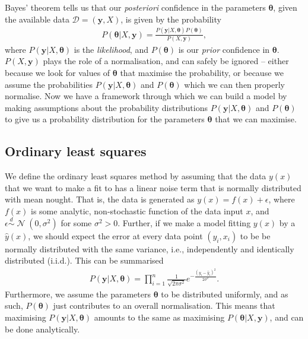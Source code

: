 \documentclass[twocolumn,english,notitlepage]{article}
\renewcommand{\vec}[1]{\boldsymbol{#1}}
\newcommand{\pclosed}[1]{\left(#1\right)}
\renewcommand{\exp}[1]{e^{#1}}
\newcommand{\normal}[2]{\operatorname{\mathcal{N}}\pclosed{#1,#2}}
\newcommand{\distas}{\overset{d}{\sim}}
\begin{document}
        Bayes' theorem tells us that our \textit{posteriori} confidence in the parameters $\vec{\theta}$, given the available data $\mathcal{D}=(\vec{y}, X)$, is given by the probability
        \begin{align}
            P(\vec{\theta}|X, \vec{y}) = \frac{P(\vec{y}|X,\vec{\vec{\theta}})P(\vec{\theta})}{P(X,\vec{y})},
        \end{align}
        where $P(\vec{y}|X, \vec{\theta})$ is the \textit{likelihood}, and $P(\vec{\theta})$ is our \textit{prior} confidence in $\vec{\theta}$. $P(X,\vec{y})$ plays the role of a normalisation, and can safely be ignored -- either because we look for values of $\vec{\theta}$ that maximise the probability, or because we assume the probabilities $P(\vec{y}|X,\vec{\theta})$ and $P(\vec{\theta})$ which we can then properly normalise. Now we have a framework through which we can build a model by making assumptions about the probability distributions $P(\vec{y}|X,\vec{\theta})$ and $P(\vec{\theta})$ to give us a probability distribution for the parameters $\vec{\theta}$ that we can maximise.


    \subsection{Ordinary least squares}
        We define the ordinary least squares method by assuming that the data $y(x)$ that we want to make a fit to has a linear noise term that is normally distributed with mean nought. That is, the data is generated as $y(x) = f(x) + \epsilon$, where $f(x)$ is some analytic, non-stochastic function of the data input $x$, and $\epsilon \distas \normal{0}{\sigma^2}$ for some $\sigma^2>0$. Further, if we make a model fitting $y(x)$ by a $\hat{y}(x)$, we should expect the error at every data point $(y_i, x_i)$ to be be normally distributed with the same variance, i.e., independently and identically distributed (i.i.d.). This can be summarised
        \begin{align}
            P(\vec{y}|X, \vec{\theta}) = \prod_{i=1}^{n} \frac{1}{\sqrt{2\pi\sigma^2}} \exp{-\frac{{(y_i-\hat{y}_i)}^2}{2\sigma^2}}.
        \end{align}
        Furthermore, we assume the parameters $\vec{\theta}$ to be distributed uniformly, and as such, $P(\vec{\theta})$ just contributes to an overall normalisation. This means that maximising $P(\vec{y}|X, \vec{\theta})$ amounts to the same as maximising $P(\vec{\theta}|X, \vec{y})$, and can be done analytically.
\end{document}
